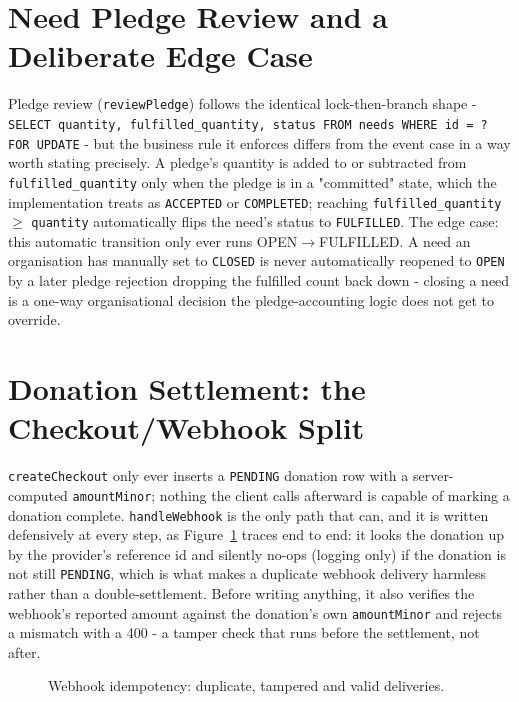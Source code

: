 \section{Need Pledge Review and a Deliberate Edge Case}
\label{sec:deepdive-needs}
Pledge review (\texttt{reviewPledge}) follows the identical lock-then-branch shape - \texttt{SELECT quantity, fulfilled\_quantity, status FROM needs WHERE id = ? FOR UPDATE} - but the business rule it enforces differs from the event case in a way worth stating precisely. A pledge's quantity is added to or subtracted from \texttt{fulfilled\_quantity} only when the pledge is in a "committed" state, which the implementation treats as \texttt{ACCEPTED} or \texttt{COMPLETED}; reaching \texttt{fulfilled\_quantity} $\geq$ \texttt{quantity} automatically flips the need's status to \texttt{FULFILLED}. The edge case: this automatic transition only ever runs OPEN$\to$FULFILLED. A need an organisation has manually set to \texttt{CLOSED} is never automatically reopened to \texttt{OPEN} by a later pledge rejection dropping the fulfilled count back down - closing a need is a one-way organisational decision the pledge-accounting logic does not get to override.

\section{Donation Settlement: the Checkout/Webhook Split}
\label{sec:deepdive-donations}
\texttt{createCheckout} only ever inserts a \texttt{PENDING} donation row with a server-computed \texttt{amountMinor}; nothing the client calls afterward is capable of marking a donation complete. \texttt{handleWebhook} is the only path that can, and it is written defensively at every step, as Figure~\ref{fig:webhook-idempotency} traces end to end: it looks the donation up by the provider's reference id and silently no-ops (logging only) if the donation is not still \texttt{PENDING}, which is what makes a duplicate webhook delivery harmless rather than a double-settlement. Before writing anything, it also verifies the webhook's reported amount against the donation's own \texttt{amountMinor} and rejects a mismatch with a 400 - a tamper check that runs before the settlement, not after. 

\begin{figure}[H]
    \centering
    \caption{Webhook idempotency: duplicate, tampered and valid deliveries.}
    \label{fig:webhook-idempotency}
\end{figure}

